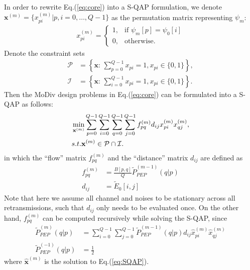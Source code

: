 \documentclass[journal]{IEEEtran}
\begin{document}
In order to rewrite Eq.(\ref{eq:core}) into a S-QAP formulation, we
denote $\mathbf{x}^{(m)} = \{x_{pi}^{(m)}|p,i=0,\ldots,Q-1\}$ as the
permutation matrix representing $\psi_m$:
\begin{align}
  x_{pi}^{(m)} = \left\{\begin{array}{ll}
        1,& \mbox{if $\psi_m[p] = \psi_0[i]$}\\
        0,& \mbox{otherwise.} 
   \end{array} \right.
\end{align}
Denote the constraint sets
\begin{subequations}
  \begin{align}
    \mathcal{P} & = \left\{\mathbf{x}:\,\sum_{p=0}^{Q-1}x_{pi} = 1,
    x_{pi}\in\{0, 1\}\right\}, \\
    \mathcal{I} & = \left\{\mathbf{x}:\,\sum_{i=0}^{Q-1}x_{pi} = 1,
    x_{pi}\in\{0, 1\}\right\}. 
    \label{eq:constraint}
  \end{align}
\end{subequations}
Then the MoDiv design problems in Eq.(\ref{eq:core}) can be formulated into a
S-QAP as follows:
\begin{align}
  & \min_{\mathbf{x}^{(m)}}\sum_{p=0}^{Q-1}\sum_{i=0}^{Q-1}
  \sum_{q=0}^{Q-1}\sum_{j=0}^{Q-1}f_{pq}^{(m)}d_{ij}x_{pi}^{(m)}x_{qj}^{(m)},
  \label{eq:SQAP}\\
  & \mbox{s.t. } \mathbf{x}^{(m)}\in \mathcal{P}\cap\mathcal{I}. \notag
\end{align}
in which the ``flow'' matrix $f_{pq}^{(m)}$ and the ``distance'' matrix $d_{ij}$
are defined as
\begin{subequations}
  \begin{align}
    f_{pq}^{(m)} & = \frac{B[p,q]}{Q}\tilde{P}_{PEP}^{(m-1)}(q|p) \\
    d_{ij}  & = \tilde{E}_0[i,j]
  \end{align}
\end{subequations}
Note that here we assume all channel and noises to be stationary across all
retransmissions, such that $d_{ij}$ only needs to be evaluated once. On the
other hand, $f_{pq}^{(m)}$ can be computed recursively while solving the S-QAP,
since
\begin{subequations}
  \begin{align}
    \tilde{P}_{PEP}^{(m)}(q|p) & = \sum_{i=0}^{Q-1}
    \sum_{j=0}^{Q-1}\tilde{P}_{PEP}^{(m-1)}(q|p)d_{ij}\hat{x}_{pi}^{(m)}\hat{x}_{qj}^{(m)}
    \\
    \tilde{P}_{PEP}^{(-1)}(q|p) & = \frac{1}{2}
  \end{align}
\end{subequations}
where $\hat{\mathbf{x}}^{(m)}$ is the solution to Eq.(\ref{eq:SQAP}). 
\end{document}
